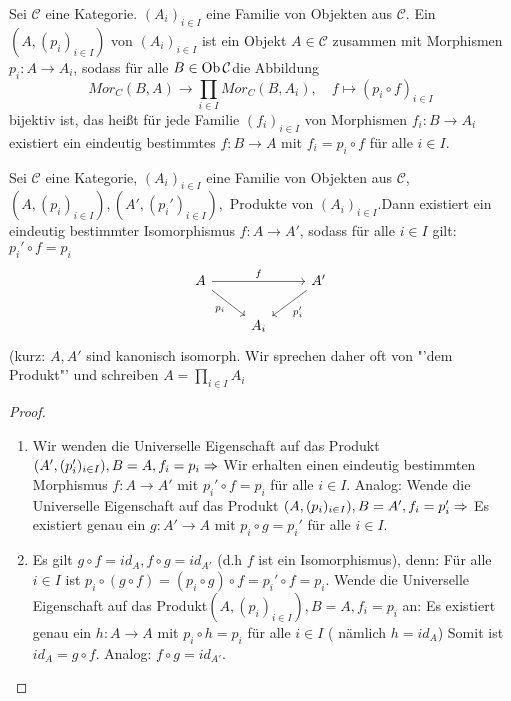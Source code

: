 \begin{df}\label{5.4}
	Sei $\mathcal{C}$ eine Kategorie. $(A_i)_{i \in I} $ eine Familie von Objekten aus $\mathcal{C}$. Ein  $(A, (p_i)_{i \in I})$ von $(A_i)_{i \in I}$ ist ein Objekt $A\in \mathcal{C} $ zusammen mit Morphismen $p_i:A \to A_i $, sodass für alle $B \in \text{Ob}\,\mathcal{C} $die Abbildung $$ Mor_C(B,A) \to \prod_{i \in I} Mor_C(B,A_i) , \quad f \mapsto (p_i \circ f) _{i \in I} $$ bijektiv ist, das heißt für jede Familie $(f_i)_{i \in I}$ von Morphismen $f_i: B \to A_i $ existiert ein eindeutig bestimmtes $f:B \to A $ mit $ f_i = p_i \circ f $ für alle $ i \in I$.
\end{df}
\begin{bem}\label{5.5}
	Sei $\mathcal{C}$ eine Kategorie, $(A_i)_{i \in I}$ eine Familie von Objekten aus $\mathcal{C}$, $(A, (p_i)_{i \in I}), (A', (p_i')_{i \in I}),$ Produkte von $(A_i)_{i \in I}. $Dann existiert ein eindeutig bestimmter Isomorphismus $ f:A \to A' $, sodass für alle $i \in I $ gilt: $p_i' \circ f = p_i$
	$$\begin{tikzcd}
	A \arrow{rr}{f} \arrow[swap]{dr}{p_i} & & A' \arrow{dl}{p_i'	}\\
	&A_i& 
	\end{tikzcd}$$
	(kurz: $A,A'$ sind kanonisch isomorph. Wir sprechen daher oft von "'dem Produkt"' und schreiben $ A = \prod_{i \in I} A_i $
\end{bem}
\begin{proof}
	\begin{enumerate} 
		\item Wir wenden die Universelle Eigenschaft auf das Produkt $(A', (p_i')_{i \in I}), B = A, f_i = p_i \Rightarrow $ Wir erhalten einen eindeutig bestimmten Morphismus $ f: A \to A' $ mit $ p_i' \circ f = p_i $ für alle $ i \in I$. Analog: Wende die Universelle Eigenschaft auf das Produkt $(A, (p_i)_{i \in I}), B = A', f_i= p_i' \Rightarrow $ Es existiert genau ein $ g: A' \to A $ mit $p_i \circ g = p_i'$ für alle $i \in I $.
		\item Es gilt $ g \circ f = id_A, f \circ g = id_{A'} $ (d.h $f$ ist ein Isomorphismus), denn: Für alle $ i \in I $ ist $p_i \circ ( g \circ f ) = ( p_i \circ g) \circ f =  p_i' \circ f = p_i $. Wende die Universelle Eigenschaft auf das Produkt$ (A, (p_i)_{i \in I}), B= A, f_i = p_i $ an:
		Es existiert genau ein $ h: A \to A $ mit $ p_i \circ h = p_i $ für alle $ i \in I $ ( nämlich $ h = id_A $) Somit ist $ id_A = g \circ f.$ Analog:  $ f \circ g = id_{A'}$.
	\end{enumerate}
\end{proof}
